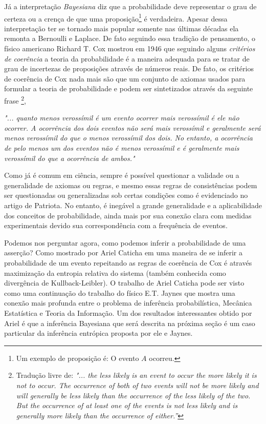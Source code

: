 Já a interpretação \textit{Bayesiana} diz que a probabilidade deve
representar o grau de certeza ou a crença de que uma proposição\footnote{Um
exemplo de proposição é: O evento $A$ ocorreu.} é verdadeira. Apesar
dessa interpretação ter se tornado mais popular somente nas últimas décadas
ela remonta a Bernoulli e Laplace. De fato seguindo essa tradição de
pensamento, o físico americano Richard T. Cox mostrou em 1946 que seguindo
alguns \textit{critérios de coerência} a teoria da probabilidade é a
maneira adequada para se tratar de grau de incertezas de proposições
através de números reais. De fato, os critérios
de coerência de Cox nada mais são que um conjunto de axiomas usados para
formular a teoria de probabilidade e podem ser sintetizados através da
seguinte frase
   \footnote{ 
       Tradução livre de:\textit{ "... the less likely is an event to occur the
       more likely it is not to occur. The occurrence of both of two events
       will not be more likely and will generally be less likely than the
       occurrence of the less likely of the two. But the occurrence of at
       least one of the events is not less likely and is generally more
       likely than the occurrence
   of either.”}
   }\citep{Cox1946},
\begin{description}
    \item 
    \textit{
        "... quanto menos verossímil é um evento ocorrer mais verossímil é
        ele não ocorrer. A ocorrência dos dois eventos não será mais
        verossímil e geralmente será menos verossímil do que o menos
        verossímil dos dois. No entanto, a ocorrência de pelo menos um dos
        eventos não é menos verossímil e é geralmente mais verossímil do
        que a ocorrência de ambos."
    }
\end{description}
Como já é comum em ciência, sempre é possível questionar a validade ou
a generalidade de axiomas ou regras, e mesmo essas regras de consistências
podem ser questionadas ou generalizadas sob certas condições como é evidenciado
no artigo de Patriota\cite{Patriota2013}. No entanto, é inegável a grande
generalidade e a aplicabilidade dos conceitos de probabilidade, ainda mais por
sua conexão clara com medidas experimentais devido sua correspondência com a
frequência de eventos.

Podemos nos perguntar agora, como podemos inferir a probabilidade de uma
asserção? Como mostrado por Ariel Caticha em\citep{CatichaA2012} uma
maneira de se inferir a probabilidade de um evento repeitando as regras de
coerência de Cox é através maximização da entropia relativa do sistema
(também conhecida como divergência de Kullback-Leibler). O trabalho de
Ariel Caticha pode ser visto como uma continuação do trabalho do físico
E.T. Jaynes\cite{Jaynes2003} que mostra uma conexão mais profunda entre o
problema de inferência probabilística, Mecânica Estatística e Teoria
da Informação. Um dos resultados interessantes obtido por Ariel é que
a inferência Bayesiana que será descrita na próxima seção é um caso
particular da inferência entrópica proposta por ele e Jaynes.

